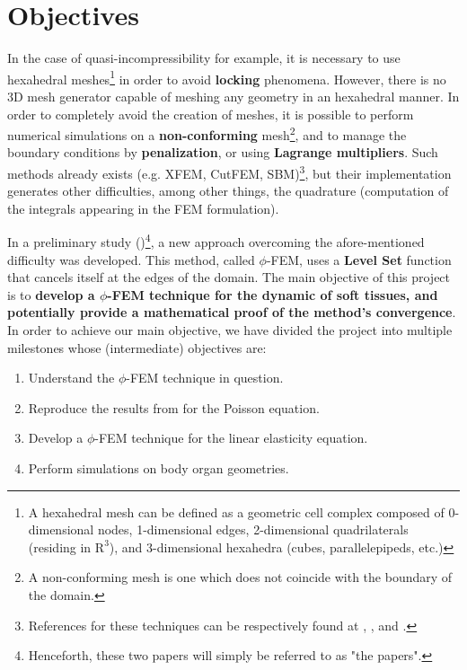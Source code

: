 \section{Objectives}

In the case of quasi-incompressibility for example, it is necessary to use hexahedral meshes\footnote{A hexahedral mesh can be defined as a geometric cell complex composed of 0-dimensional nodes, 1-dimensional edges, 2-dimensional quadrilaterals (residing in $\mathrm{R}^3$), and 3-dimensional hexahedra (cubes, parallelepipeds, etc.)} in order to avoid \textbf{locking} phenomena. However, there is no 3D mesh generator capable of meshing any geometry in an hexahedral manner. In order to completely avoid the creation of meshes, it is possible to perform numerical simulations on a \textbf{non-conforming} mesh\footnote{A non-conforming mesh is one which does not coincide with the boundary of the domain.}, and to manage the boundary conditions by \textbf{penalization}, or using \textbf{Lagrange multipliers}. Such methods already exists (e.g. XFEM, CutFEM, SBM)\footnote{References for these techniques can be respectively found at \parencite{XFEM}, \parencite{burman2015cutfem}, and \parencite{atallah2020analysis}.}, but their implementation generates other difficulties, among other things, the quadrature (computation of the integrals appearing in the FEM formulation).

In a preliminary study (\cite{Reference3,Reference4})\footnote{Henceforth, these two papers will simply be referred to as "the papers".}, a new approach overcoming the afore-mentioned difficulty was developed. This method, called $\phi$-FEM, uses a \textbf{Level Set} function that cancels itself at the edges of the domain. The main objective of this project is to \textbf{develop a $\phi$-FEM technique for the dynamic of soft tissues, and potentially provide a mathematical proof of the method's convergence}. In order to achieve our main objective, we have divided the project into multiple milestones whose (intermediate) objectives are:
\begin{enumerate}
    \item Understand the $\phi$-FEM technique in question.
    \item Reproduce the results from \parencite{Reference3} for the Poisson equation.
    \item Develop a $\phi$-FEM technique for the linear elasticity equation.
    \item Perform simulations on body organ geometries.
\end{enumerate}

